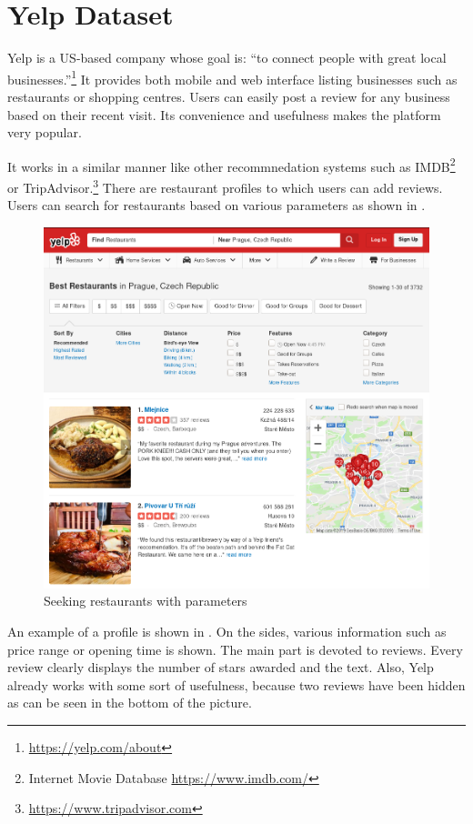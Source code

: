 \chapter{Yelp Dataset}\label{app:dataset}

Yelp is a US-based company whose goal is: ``to connect people with great local businesses.''\footnote{\url{https://yelp.com/about}}
It provides both mobile and web interface listing businesses such as restaurants or shopping centres.
Users can easily post a review for any business based on their recent visit.
Its convenience and usefulness makes the platform very popular.

It works in a similar manner like other recommnedation systems such as IMDB\footnote{Internet Movie Database \url{https://www.imdb.com/}} or
TripAdvisor.\footnote{\url{https://www.tripadvisor.com}}
There are restaurant profiles to which users can add reviews.
Users can search for restaurants based on various parameters as shown in .

\begin{figure}[ht]\centering
\includegraphics[width=130mm]{../img/filters.png}
\caption{Seeking restaurants with parameters}
\label{fig:filters}
\end{figure}

An example of a profile is shown in .
On the sides, various information such as price range or opening time is shown.
The main part is devoted to reviews.
Every review clearly displays the number of stars awarded and the text.
Also, Yelp already works with some sort of usefulness,
because two reviews have been hidden as can be seen in the bottom of the picture.

